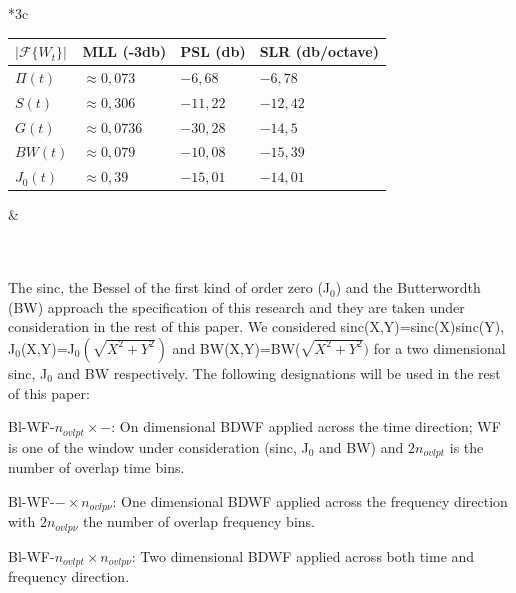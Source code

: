 \documentclass[useAMS,usenatbib]{mn2e}
\begin{document}
\hspace{0.008cm}\begin{tabular}{*3{c}}
 \\
 \hspace{-1cm}\begin{tabular}{|l|l|l|l|}
  \footnotesize $|\mathcal{F}\Big\{W_{t}\Big\}|$ &\textbf{\footnotesize MLL (-3db)}&\textbf{\footnotesize PSL (db)} &\textbf{\footnotesize 
SLR (db/octave) }  \\
  \hline\hline
  {\footnotesize $\Pi(t)$} &{\footnotesize $\approx 0,073$} &{\footnotesize $-6,68$}&{\footnotesize 
$-6,78$}\\
  {\footnotesize $S(t)$} &{\footnotesize  $\approx0,306$}&{\footnotesize  $-11,22$}&{\footnotesize  
$-12,42$} \\
  {\footnotesize $G(t)$} & {\footnotesize $\approx0,0736$}&{\footnotesize  $-30,28$}&{\footnotesize  $-14,5$}\\ 
  {\footnotesize $BW(t)$} &{\footnotesize  $\approx0,079$} &{\footnotesize $-10,08$ }&{\footnotesize  $-15,39$}\\
  {\footnotesize $J_0(t)$} &{\footnotesize  $\approx 0,39$} &{\footnotesize $ -15,01$ }&{\footnotesize  $ -14,01$}
  \end{tabular}& \label{BDWBnoise}
\end{tabular}\\
\\

\hspace{-0.6cm}The sinc, the Bessel of the first kind of order zero (J$_0$) and the Butterwordth (BW)  approach the specification of this 
research and they are taken under consideration in the rest of this paper.  We considered sinc(X,Y)=sinc(X)sinc(Y), 
J$_0$(X,Y)=J$_0(\sqrt{X^2 + Y^2})$ and BW(X,Y)=BW($\sqrt{X^2 + Y^2})$ for a two dimensional 
sinc, J$_0$ and BW respectively.
The following designations will be used in the rest of this paper:

Bl-WF-$n_{ovlpt}\times -$: On dimensional BDWF applied across the time direction; WF is one of the window under 
consideration (sinc, J$_0$ and BW) and $2n_{ovlpt}$ is the number of overlap time bins.

Bl-WF-$-\times n_{ovlp\nu}$: One dimensional BDWF applied across the frequency direction with $2n_{ovlp\nu}$ the number of overlap 
frequency bins.

Bl-WF-$n_{ovlpt}\times n_{ovlp\nu}$: Two dimensional BDWF applied across both time and frequency direction.
\end{document}
